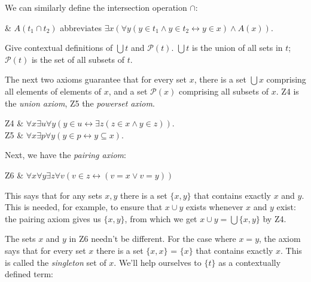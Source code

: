 We can similarly define the intersection operation $\cap$:
\begin{axioms}
  &
  $A(t_{1} \cap t_{2})$ abbreviates
  $\exists x(\forall y(y\in t_1 \land y \in t_2 \leftrightarrow y \in x) \land A(x))$.
\end{axioms}

\begin{exercise}
  Give contextual definitions of $\bigcup t$ and $\mathcal{P}(t)$.
  $\bigcup t$ is the union of all sets in $t$;
  $\mathcal{P}(t)$ is the set of all subsets of $t$.
\end{exercise}


The next two axioms guarantee that
for every set $x$,
there is a set $\bigcup x$ comprising all elements of elements of $x$,
and a set $\mathcal{P}(x)$ comprising all subsets of $x$.
Z4 is the \emph{union axiom},
Z5 the \emph{powerset axiom}.

\begin{axioms}
  Z4 & $\forall x\exists u\forall y(y\in u \leftrightarrow \exists z(z\in x \land y\in z)).$\\
  Z5 & $\forall x\exists p\forall y(y\in p \leftrightarrow y\subseteq x).$
\end{axioms}


Next,
we have the \emph{pairing axiom}:
%
\begin{axioms}
   Z6 & $\forall x\forall y \exists z\forall v(v\in z \leftrightarrow (v=x \lor v=y))$
\end{axioms}
%
\noindent%
This says that
for any sets $x,y$
there is a set $\{x,y\}$ that contains exactly $x$ and $y$.
This is needed, for example,
to ensure that $x \cup y$ exists whenever $x$ and $y$ exist:
the pairing axiom gives us $\{x,y\}$,
from which we get $x \cup y = \bigcup \{x,y\}$ by Z4.

The sets $x$ and $y$ in Z6 needn't be different.
For the case where $x = y$,
the axiom says that
for every set $x$ there is a set $\{x,x\}$ = $\{ x \}$ that contains exactly $x$.
This is called the \emph{singleton} set of $x$.
We'll help ourselves to $\{t\}$ as a contextually defined term:

